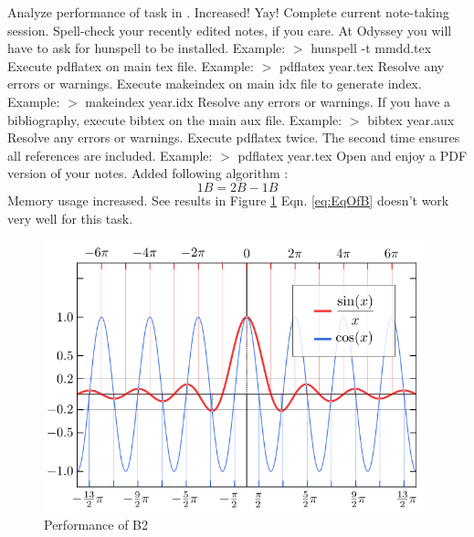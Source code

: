     \stit
      \itm Analyze performance of task in . %
      \itm Increased! Yay!
    \enit
    \sten
      \itm Complete current note-taking session. 
      \itm Spell-check your recently edited notes, if you care. At Odyssey you will have to ask for hunspell to be installed. 
           Example: $>$ hunspell -t mmdd.tex
      \itm Execute pdflatex on main tex file. Example: $>$ pdflatex year.tex
      \itm Resolve any errors or warnings.
      \itm Execute makeindex on main idx file to generate index. Example: $>$ makeindex year.idx
      \itm Resolve any errors or warnings.
      \itm If you have a bibliography, execute bibtex on the main aux file. Example: $>$ bibtex year.aux
      \itm Resolve any errors or warnings.
      \itm Execute pdflatex twice. The second time ensures all references are included. Example: $>$ pdflatex year.tex
      \itm Open and enjoy a PDF version of your notes.
    \enen
    \stit
      \itm Added following algorithm \cite{bk:gps_misra}: %
      \begin{equation}\label{eq:EqOfB}
        1B = 2B - 1B
      \end{equation}
      \itm Memory usage increased.
    \enit
    \stit
      \itm See results in Figure \ref{fig:B2}
      \itm Eqn. \ref{eq:EqOfB} doesn't work very well for this task.
      \begin{figure}[H]
        \begin{center}
        \includegraphics[width=1.0\textwidth]{year/fig/picture}
        \caption{Performance of B2}
        \label{fig:B2}
        \end{center}
      \end{figure}
